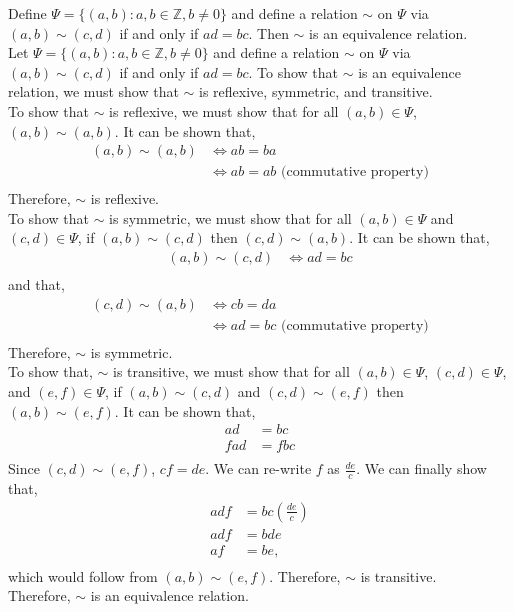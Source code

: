 \documentclass[12pt]{article}
\newenvironment{theorem}[2][Theorem]{\begin{trivlist}
\item[\hskip \labelsep {\bfseries #1}\hskip \labelsep {\bfseries #2.}]}{\end{trivlist}}
\begin{document}
\begin{theorem}{6 (complete)} 
	Define $\Psi = \{(a,b): a,b \in \mathbb{Z}, b\neq 0\}$ and define a relation $\sim$ on $\Psi$ via $(a,b) \sim (c,d)$ if and only if
	$ad=bc$. Then $\sim$ is an equivalence relation.\\

	Let $\Psi = \{(a,b): a,b \in \mathbb{Z}, b\neq 0\}$ and define a relation $\sim$ on $\Psi$ via $(a,b) \sim (c,d)$ if and only if
	$ad=bc$. To show that $\sim$ is an equivalence relation, we must show that $\sim$ is reflexive, symmetric, and transitive.\\

	To show that $\sim$ is reflexive, we must show that for all $(a,b) \in \Psi$, $(a,b) \sim (a,b)$.
	It can be shown that, 
	\begin{align*}
		(a,b) \sim (a,b) &\Leftrightarrow ab=ba\\
				 &\Leftrightarrow ab=ab \text{ (commutative property)}\\
	\end{align*}
	Therefore, $\sim$ is reflexive.\\

	To show that $\sim$ is symmetric, we must show that for all $(a,b) \in \Psi$ and $(c,d) \in \Psi$, if $(a,b) \sim (c,d)$ then $(c,d) \sim (a,b)$.
	It can be shown that,
	\begin{align*}
		(a,b) \sim (c,d) &\Leftrightarrow ad=bc\\
	\end{align*}
	and that,
	\begin{align*}
		(c,d) \sim (a,b) &\Leftrightarrow cb=da\\
				 &\Leftrightarrow ad=bc \text{ (commutative property)}\\
	\end{align*}
	Therefore, $\sim$ is symmetric.\\

	To show that, $\sim$ is transitive, we must show that for all $(a,b) \in \Psi$, $(c,d) \in \Psi$, and $(e,f) \in \Psi$, if $(a,b) \sim (c,d)$ and $(c,d) \sim (e,f)$ then $(a,b) \sim (e,f)$.
	It can be shown that,
	\begin{align*}
		ad&=bc\\
		fad&=fbc\\
	\end{align*}
	Since $(c,d)\sim(e,f)$, $cf=de$. We can re-write $f$ as $\frac{de}{c}$. We can finally show that,
	\begin{align*}
		adf&=bc(\frac{de}{c})\\
		adf&=bde\\
		af&=be \text{,}\\
	\end{align*}
	which would follow from $(a,b)\sim(e,f)$. Therefore, $\sim$ is transitive.\\

	Therefore, $\sim$ is an equivalence relation.\\
\end{theorem}
		
\end{document}
